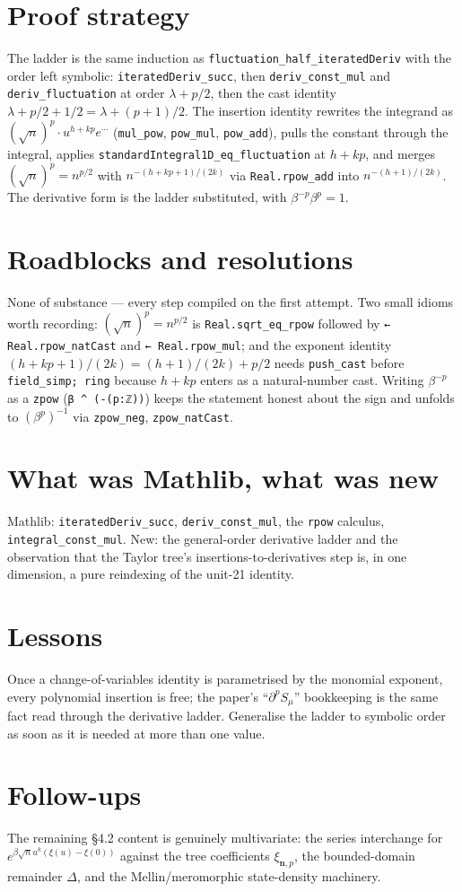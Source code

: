 \documentclass[11pt]{article}
\begin{document}
\section{Proof strategy}
The ladder is the same induction as \texttt{fluctuation\_half\_iteratedDeriv} with the order left
symbolic: \texttt{iteratedDeriv\_succ}, then \texttt{deriv\_const\_mul} and \texttt{deriv\_fluctuation}
at order $\lambda+p/2$, then the cast identity $\lambda+p/2+1/2=\lambda+(p{+}1)/2$. The insertion
identity rewrites the integrand as $(\sqrt n)^p\cdot u^{h+kp}e^{\cdots}$ (\texttt{mul\_pow},
\texttt{pow\_mul}, \texttt{pow\_add}), pulls the constant through the integral, applies
\texttt{standardIntegral1D\_eq\_fluctuation} at $h+kp$, and merges $(\sqrt n)^p=n^{p/2}$ with
$n^{-(h+kp+1)/(2k)}$ via \texttt{Real.rpow\_add} into $n^{-(h+1)/(2k)}$. The derivative form is the
ladder substituted, with $\beta^{-p}\beta^p=1$.

\section{Roadblocks and resolutions}
None of substance --- every step compiled on the first attempt. Two small idioms worth recording:
$(\sqrt n)^p=n^{p/2}$ is \texttt{Real.sqrt\_eq\_rpow} followed by \texttt{← Real.rpow\_natCast} and
\texttt{← Real.rpow\_mul}; and the exponent identity $(h+kp+1)/(2k)=(h+1)/(2k)+p/2$ needs
\texttt{push\_cast} before \texttt{field\_simp; ring} because $h+kp$ enters as a natural-number cast.
Writing $\beta^{-p}$ as a \texttt{zpow} (\texttt{β\,\^{}\,(-(p:ℤ))}) keeps the statement honest about the
sign and unfolds to $(\beta^p)^{-1}$ via \texttt{zpow\_neg}, \texttt{zpow\_natCast}.

\section{What was Mathlib, what was new}
Mathlib: \texttt{iteratedDeriv\_succ}, \texttt{deriv\_const\_mul}, the \texttt{rpow} calculus,
\texttt{integral\_const\_mul}. New: the general-order derivative ladder and the observation that the
Taylor tree's insertions-to-derivatives step is, in one dimension, a pure reindexing of the unit-21
identity.

\section{Lessons}
Once a change-of-variables identity is parametrised by the monomial exponent, every polynomial
insertion is free; the paper's ``$\partial^p S_\mu$'' bookkeeping is the same fact read through the
derivative ladder. Generalise the ladder to symbolic order as soon as it is needed at more than one
value.

\section{Follow-ups}
The remaining \S4.2 content is genuinely multivariate: the series interchange for
$e^{\beta\sqrt n u^k(\xi(u)-\xi(0))}$ against the tree coefficients $\xi_{\mathbf n,p}$, the
bounded-domain remainder $\Delta$, and the Mellin/meromorphic state-density machinery.
\end{document}
